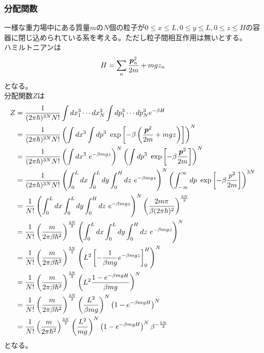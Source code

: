 \documentclass[dvipdfmx, 11pt, a4paper]{jsarticle}
\theoremstyle{definition}
\begin{document}
\subsubsection{分配関数}
    一様な重力場中にある質量$m$の$N$個の粒子が$0 \le x \le L, 0 \le y \le L, 0 \le z \le H $の容器に閉じ込められている系を考える。ただし粒子間相互作用は無いとする。\\
    ハミルトニアンは
    \begin{align}
        H = \sum_n \frac{\bm{p}_n^2}{2m} + mgz_n \notag
    \end{align}
    となる。\\
    分配関数$Z$は
    \begin{align}
        Z &= \frac{1}{(2\pi \hbar)^{3N} N!} \int dx^3_1 \cdots dx^3_N \int dp^3_1 \cdots d p^3_N e^{-\beta H} \notag \\
        &= \frac{1}{(2\pi \hbar)^{3N} N!} \left( \int dx^3 \int dp^3\ \exp\left[ -\beta \left( \frac{\bm{p}^2}{2m} + mgz \right) \right] \right)^N \notag \\
        &= \frac{1}{(2\pi \hbar)^{3N} N!} \left( \int dx^3\ e^{ -\beta  mgz } \right)^N \left( \int dp^3\ \exp\left[ -\beta \frac{\bm{p}^2}{2m} \right] \right)^N \notag \\ 
        &= \frac{1}{(2\pi \hbar)^{3N} N!} \left( \int_0^L dx \int_0^L dy\int_0^H dz\ e^{ -\beta  mgz } \right)^N \left( \int_{-\infty}^\infty dp\ \exp\left[ -\beta \frac{p^2}{2m} \right] \right)^{3N} \notag \\
        &= \frac{1}{N!} \left( \int_0^L dx \int_0^L dy\int_0^H dz\ e^{ -\beta  mgz } \right)^N \left( \frac{2m\pi}{\beta (2\pi \hbar)^{2}} \right)^{\frac{3N}{2}} \notag \\
        &= \frac{1}{N!} \left( \frac{m}{ 2\pi \beta \hbar^2} \right)^{\frac{3N}{2}} \left( \int_0^L dx \int_0^L dy\int_0^H dz\ e^{ -\beta  mgz } \right)^N  \notag \\
        &= \frac{1}{N!} \left( \frac{m}{ 2\pi \beta \hbar^2} \right)^{\frac{3N}{2}} \left( L^2\left[ -\frac{1}{\beta mg} e^{ -\beta  mgz } \right]_0^H\right)^N  \notag \\
        &= \frac{1}{N!} \left( \frac{m}{ 2\pi \beta \hbar^2} \right)^{\frac{3N}{2}} \left(L^2 \frac{1 - e^{ -\beta  mgH } }{\beta mg} \right)^N  \notag \\
        &= \frac{1}{N!} \left( \frac{m}{ 2\pi \beta \hbar^2} \right)^{\frac{3N}{2}} \left( 
        \frac{L^2}{\beta mg} \right)^N \left(1 - e^{ -\beta  mgH} \right)^N  \notag \\
        &= \frac{1}{N!} \left( \frac{m}{ 2\pi \hbar^2} \right)^{\frac{3N}{2}} \left( 
        \frac{L^2}{mg} \right)^N \left(1 - e^{ -\beta  mgH} \right)^N \beta^{-\frac{5N}{2}} 
    \end{align}
    となる。
\end{document}
